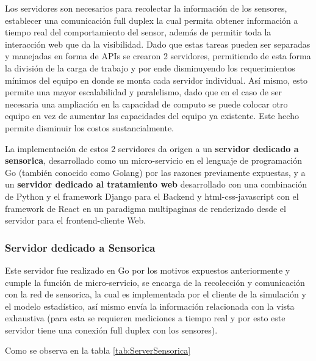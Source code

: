     Los servidores son necesarios para recolectar la información de los sensores,
    establecer una comunicación full duplex la cual permita obtener información
    a tiempo real del comportamiento del sensor, además de permitir toda la
    interacción web que da la visibilidad. Dado que estas tareas pueden ser
    separadas y manejadas en forma de APIs se crearon 2 servidores, permitiendo
    de esta forma la división de la carga de trabajo y por ende disminuyendo los
    requerimientos mínimos del equipo en donde se monta cada servidor individual.
    Así mismo, esto permite una mayor escalabilidad y paralelismo, dado que en el
    caso de ser necesaria una ampliación en la capacidad de computo se puede colocar
    otro equipo en vez de aumentar las capacidades del equipo ya existente. Este
    hecho permite disminuir los costos sustancialmente.

    La implementación de estos 2 servidores da origen a un \textbf{servidor dedicado
    a sensorica}, desarrollado como un micro-servicio en el lenguaje de programación
    Go (también conocido como Golang) por las razones previamente expuestas, y
    a un \textbf{servidor dedicado al tratamiento web} desarrollado con una
    combinación de Python y el framework Django para el Backend y html-css-javascript
    con el framework de React en un paradigma multipaginas de renderizado desde
    el servidor para el frontend-cliente Web.

    \subsubsection{Servidor dedicado a Sensorica}

    Este servidor fue realizado en Go por los motivos expuestos anteriormente y
    cumple la función de micro-servicio, se encarga de la recolección y comunicación
    con la red de sensorica, la cual es implementada por el cliente de la simulación
    y el modelo estadístico, así mismo envía la información relacionada con la
    vista exhaustiva (para esta se requieren mediciones a tiempo real y por esto
    este servidor tiene una conexión full duplex con los sensores).

    Como se observa en la tabla \ref{tab:ServerSensorica}

